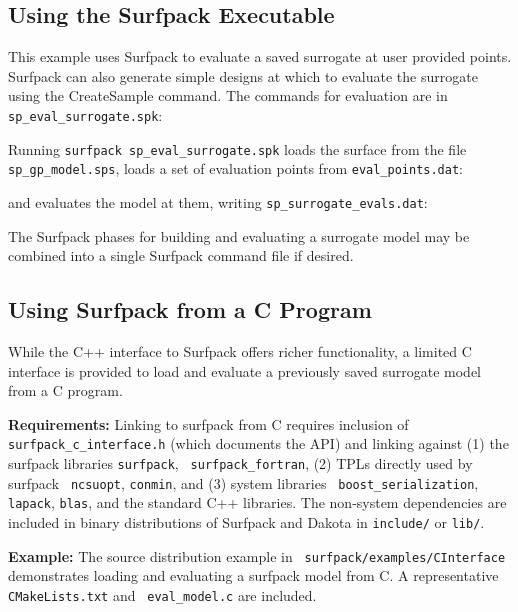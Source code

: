 \documentclass{article}
\begin{document}
\subsection{Using the Surfpack Executable}

This example uses Surfpack to evaluate a saved surrogate at user
provided points.  Surfpack can also generate simple designs at which
to evaluate the surrogate using the CreateSample command.  The
commands for evaluation are in {\tt sp\_eval\_surrogate.spk}:\\
\begin{bigbox}

\end{bigbox}
Running {\tt surfpack sp\_eval\_surrogate.spk} loads the surface from
the file {\tt sp\_gp\_model.sps}, loads a
set of evaluation points from {\tt eval\_points.dat}:\\
\begin{bigbox}

\end{bigbox}

and evaluates the model at them, writing {\tt sp\_surrogate\_evals.dat}:\\
\begin{bigbox}

\end{bigbox}

The Surfpack phases for building and evaluating a surrogate model may
be combined into a single Surfpack command file if desired.

\subsection{Using Surfpack from a C Program}

While the C++ interface to Surfpack offers richer functionality, a
limited C interface is provided to load and evaluate a previously
saved surrogate model from a C program.

{\bf Requirements:} Linking to surfpack from C requires inclusion of {\tt
  surfpack\_c\_interface.h} (which documents the API) and linking
against (1) the surfpack libraries {\tt surfpack}, {\tt
  surfpack\_fortran}, (2) TPLs directly used by surfpack {\tt
  ncsuopt}, {\tt conmin}, and (3) system libraries {\tt
  boost\_serialization}, {\tt lapack}, {\tt blas}, and the standard
C++ libraries.  The non-system dependencies are included in binary
distributions of Surfpack and Dakota in {\tt include/} or {\tt lib/}.

{\bf Example:} The source distribution example in {\tt
  surfpack/examples/CInterface} demonstrates loading and evaluating a
surfpack model from C.  A representative {\tt CMakeLists.txt} and {\tt
  eval\_model.c} are included.
\end{document}
